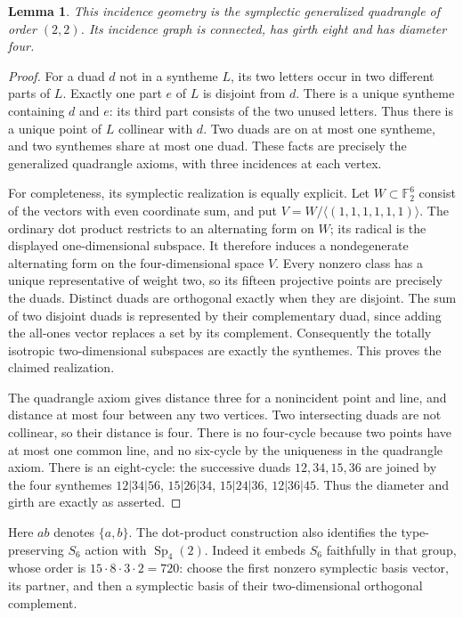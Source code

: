 \documentclass[11pt]{article}
\newtheorem{lemma}{Lemma}
\begin{document}
\begin{lemma}\label{quadrangle}
This incidence geometry is the symplectic generalized quadrangle of
order $(2,2)$. Its incidence graph is connected, has girth eight and
has diameter four.
\end{lemma}
\begin{proof}
For a duad $d$ not in a syntheme $L$, its two letters occur in two
different parts of $L$. Exactly one part $e$ of $L$ is disjoint from
$d$. There is a unique syntheme containing $d$ and $e$: its third
part consists of the two unused letters. Thus there is a unique point
of $L$ collinear with $d$. Two duads are on at most one syntheme,
and two synthemes share at most one duad. These facts are precisely
the generalized quadrangle axioms, with three incidences at each vertex.

For completeness, its symplectic realization is equally explicit.
Let $W\subset\mathbb F_2^6$ consist of the vectors with even
coordinate sum, and put $V=W/\langle(1,1,1,1,1,1)\rangle$.
The ordinary dot product restricts to an alternating form on $W$;
its radical is the displayed one-dimensional subspace. It therefore
induces a nondegenerate alternating form on the four-dimensional
space $V$. Every nonzero class has a unique representative of weight
two, so its fifteen projective points are precisely the duads.
Distinct duads are orthogonal exactly when they are disjoint. The
sum of two disjoint duads is represented by their complementary
duad, since adding the all-ones vector replaces a set by its complement.
Consequently the totally isotropic two-dimensional subspaces are
exactly the synthemes. This proves the claimed realization.

The quadrangle axiom gives distance three for a nonincident point
and line, and distance at most four between any two vertices.
Two intersecting duads are not collinear, so their distance is four.
There is no four-cycle because two points have at most one common
line, and no six-cycle by the uniqueness in the quadrangle axiom.
There is an eight-cycle: the successive duads
$12,34,15,36$ are joined by the four synthemes
$12|34|56$, $15|26|34$, $15|24|36$, $12|36|45$.
Thus the diameter and girth are exactly as asserted.
\end{proof}

Here $ab$ denotes $\{a,b\}$. The dot-product construction also
identifies the type-preserving $S_6$ action with $\operatorname{Sp}_4(2)$.
Indeed it embeds $S_6$ faithfully in that group, whose order is
$15\cdot8\cdot3\cdot2=720$: choose the first nonzero symplectic
basis vector, its partner, and then a symplectic basis of their
two-dimensional orthogonal complement.
\end{document}
